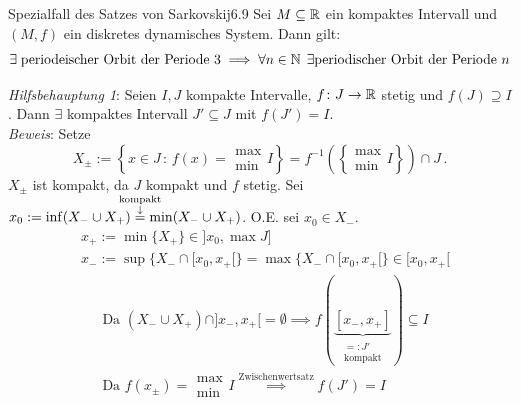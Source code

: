 \documentclass[a4paper]{article}
\begin{document}
\begin{Satz}{Spezialfall des Satzes von Sarkovskij}{6.9}
Sei $M\subseteq \mathbb R$ ein kompaktes Intervall und $(M,f)$ ein diskretes dynamisches System. Dann gilt:
\[\exists\;\text{periodeischer Orbit der Periode 3}\implies \forall n\in\operatorname{\mathbb N}\;\exists \text{periodischer Orbit der Periode $n$}\]
\end{Satz}

\begin{Beweis}
\textit{Hilfsbehauptung 1}: Seien $I,J$ kompakte Intervalle, $f\colon J\to\mathbb R$ stetig und $f(J)\supseteq I$. Dann $\exists$ kompaktes Intervall $J'\subseteq J$ mit $f(J')=I$.\\
\textit{Beweis}: Setze 
\[X_{\pm}:=\left\{x\in  J\,:\,f(x)=\begin{array}{l}
\max\\\min
\end{array} I\right\}=f^{-1}\left(\left\{ \begin{array}{l}
\max\\
\min
\end{array}  I\right\}\right)\cap J\,.\]
$X_{\pm}$ ist kompakt, da $J$ kompakt und $f$ stetig.
Sei $x_0:=\inf(X_-\cup X_+)\overset{\ms{\text{kompakt}\\\downarrow}}{=}\min(X_-\cup X_+)$. O.E. sei $x_0\in X_-$.
\begin{align*}
&x_+:=\min\{X_+\}\in ]x_0,\max J]\\
&x_-:=\sup\{X_-\cap[x_0,x_+[\}=\max\{X_-\cap[x_0,x_+[\}\in [x_0,x_+[
\end{align*}
\begin{align*}
&\text{Da }(X_-\cup X_+)\cap ]x_-,x_+[=\emptyset\implies f(\underbrace{[x_-,x_+]}_{\substack{=:J'\\\text{kompakt}}})\subseteq I \\
&\text{Da }f(x_{\pm})= \begin{array}{l}
\max\\\min
\end{array} I\overset{\text{Zwischenwertsatz}}{\implies} f(J')=I
\end{align*}


\end{Beweis}
\end{document}

